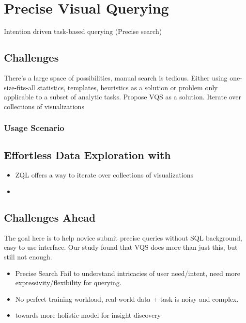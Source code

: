 \section{Precise Visual Querying\label{sec:precise}}
Intention driven task-based querying (Precise search)
\subsection{Challenges}
There’s a large space of possibilities, manual search is tedious. Either using one-size-fits-all statistics, templates, heuristics as a solution or problem only applicable to a subset of analytic tasks\cite{Vartak2015,Vartak2017}. Propose VQS as a solution\cite{Lee2017}. Iterate over collections of visualizations \cite{Siddiqui}
\subsubsection{Usage Scenario}
\subsection{Effortless Data Exploration with \zv}
\begin{itemize}
	\item ZQL offers a way to iterate over collections of visualizations\cite{Wongsuphasawat2016}
	\item 
\end{itemize}

\subsection{Challenges Ahead}
The goal here is to help novice submit precise queries without SQL background, easy to use interface. Our study found that VQS does more than just this, but still not enough.
\begin{itemize}
	\item Precise Search Fail to understand intricacies of user need/intent, need more expressivity/flexibility for querying.
	\item  No perfect training workload, real-world data + task is noisy and complex. 
	\item towards more holistic model for insight discovery
\end{itemize}
